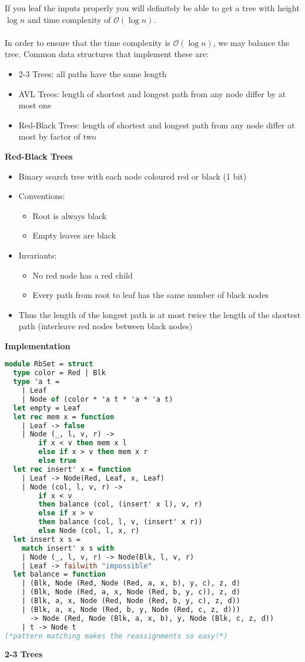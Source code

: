 \documentclass[12pt,a4paper]{article} %
\begin{document}
If you leaf the inputs properly you will definitely be able to get a tree with height $\log n$ and time complexity of $\mathcal{O}(\log n)$.
\\\\
In order to ensure that the time complexity is $\mathcal{O}(\log n)$, we may balance the tree. Common data structures that implement these are:
\begin{itemize}
	\item 2-3 Trees: all paths have the same length
	\item AVL Trees: length of shortest and longest path from any node differ by at most one
	\item Red-Black Trees: length of shortest and longest path from any node differ at most by factor of two
\end{itemize}
\textbf{Red-Black Trees}
\begin{itemize}
	\item Binary search tree with each node coloured red or black (1 bit)
	\item Conventions:
	\begin{itemize}
		\item Root is always black
		\item Empty leaves are black
	\end{itemize}
	\item Invariants:
	\begin{itemize}
		\item No red node has a red child
		\item Every path from root to leaf has the same number of black nodes
	\end{itemize}
	\item Thus the length of the longest path is at most twice the length of the shortest path (interleave red nodes between black nodes)
\end{itemize}
\textbf{Implementation}
\begin{lstlisting}[language=Caml]
module RbSet = struct
  type color = Red | Blk
  type 'a t =
    | Leaf
    | Node of (color * 'a t * 'a * 'a t)
  let empty = Leaf
  let rec mem x = function
    | Leaf -> false
    | Node (_, l, v, r) ->
        if x < v then mem x l
        else if x > v then mem x r
        else true
  let rec insert' x = function
    | Leaf -> Node(Red, Leaf, x, Leaf)
    | Node (col, l, v, r) ->
        if x < v
        then balance (col, (insert' x l), v, r)
        else if x > v
        then balance (col, l, v, (insert' x r))
        else Node (col, l, x, r)
  let insert x s =
    match insert' x s with
    | Node (_, l, v, r) -> Node(Blk, l, v, r)
    | Leaf -> failwith "impossible"
  let balance = function
    | (Blk, Node (Red, Node (Red, a, x, b), y, c), z, d)
    | (Blk, Node (Red, a, x, Node (Red, b, y, c)), z, d)
    | (Blk, a, x, Node (Red, Node (Red, b, y, c), z, d))
    | (Blk, a, x, Node (Red, b, y, Node (Red, c, z, d)))
      -> Node (Red, Node (Blk, a, x, b), y, Node (Blk, c, z, d))
    | t -> Node t
(*pattern matching makes the reassignments so easy!*)
\end{lstlisting}
\textbf{2-3 Trees}
\end{document}
